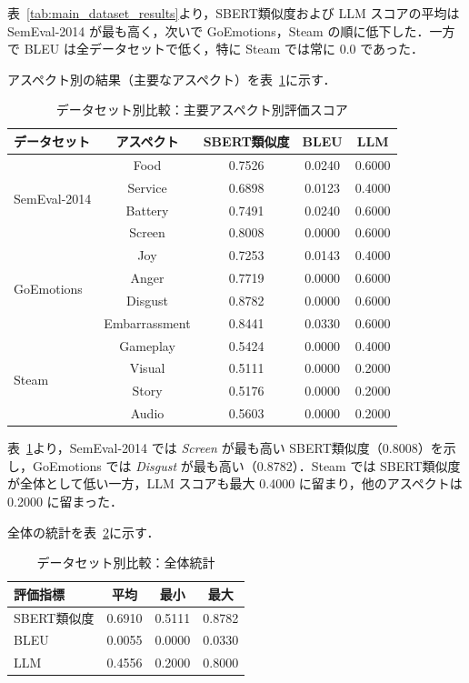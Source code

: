 表~\ref{tab:main_dataset_results}より，SBERT類似度および LLM スコアの平均は SemEval-2014 が最も高く，次いで GoEmotions，Steam の順に低下した．一方で BLEU は全データセットで低く，特に Steam では常に 0.0 であった．

アスペクト別の結果（主要なアスペクト）を表~\ref{tab:main_aspect_results}に示す．
\begin{table}[htbp]
  \centering
  \caption{データセット別比較：主要アスペクト別評価スコア}
  \label{tab:main_aspect_results}
  \begin{tabular}{lcccc}
    \toprule
    データセット & アスペクト & SBERT類似度 & BLEU & LLM \\
    \midrule
    \multirow{4}{*}{SemEval-2014} & Food & 0.7526 & 0.0240 & 0.6000 \\
    & Service & 0.6898 & 0.0123 & 0.4000 \\
    & Battery & 0.7491 & 0.0240 & 0.6000 \\
    & Screen & 0.8008 & 0.0000 & 0.6000 \\
    \midrule
    \multirow{4}{*}{GoEmotions} & Joy & 0.7253 & 0.0143 & 0.4000 \\
    & Anger & 0.7719 & 0.0000 & 0.6000 \\
    & Disgust & 0.8782 & 0.0000 & 0.6000 \\
    & Embarrassment & 0.8441 & 0.0330 & 0.6000 \\
    \midrule
    \multirow{4}{*}{Steam} & Gameplay & 0.5424 & 0.0000 & 0.4000 \\
    & Visual & 0.5111 & 0.0000 & 0.2000 \\
    & Story & 0.5176 & 0.0000 & 0.2000 \\
    & Audio & 0.5603 & 0.0000 & 0.2000 \\
    \bottomrule
  \end{tabular}
\end{table}

表~\ref{tab:main_aspect_results}より，SemEval-2014 では \textit{Screen} が最も高い SBERT類似度（0.8008）を示し，GoEmotions では \textit{Disgust} が最も高い（0.8782）．Steam では SBERT類似度が全体として低い一方，LLM スコアも最大 0.4000 に留まり，他のアスペクトは 0.2000 に留まった．

全体の統計を表~\ref{tab:main_overall_stats}に示す．
\begin{table}[htbp]
  \centering
  \caption{データセット別比較：全体統計}
  \label{tab:main_overall_stats}
  \begin{tabular}{lccc}
    \toprule
    評価指標 & 平均 & 最小 & 最大 \\
    \midrule
    SBERT類似度 & 0.6910 & 0.5111 & 0.8782 \\
    BLEU & 0.0055 & 0.0000 & 0.0330 \\
    LLM & 0.4556 & 0.2000 & 0.8000 \\
    \bottomrule
  \end{tabular}
\end{table}

